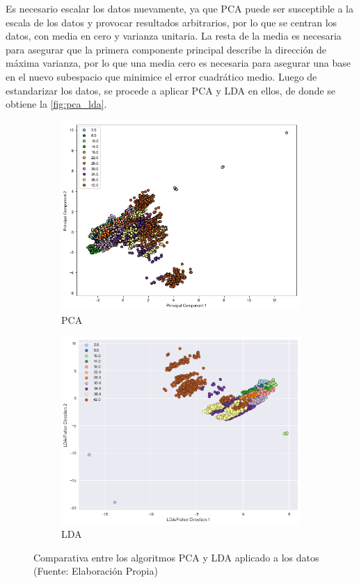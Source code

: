 Es necesario escalar los datos nuevamente, ya que PCA puede ser susceptible a la escala de los datos y provocar resultados arbitrarios, por lo que se centran los datos, con media en cero y varianza unitaria. La resta de la media es necesaria para asegurar que la primera componente principal describe la dirección de máxima varianza, por lo que una media cero es necesaria para asegurar una base en el nuevo subespacio que minimice el error cuadrático medio. Luego de estandarizar los datos, se procede a aplicar PCA y LDA en ellos, de donde se obtiene la \autoref{fig:pca_lda}.

\begin{figure}[ht!]
\centering
\begin{subfigure}{.5\textwidth}
  \centering
  \includegraphics[width=.8\linewidth]{figures/pca.png}
  \caption{PCA}
  \label{fig:sub1}
\end{subfigure}%
\begin{subfigure}{.5\textwidth}
  \centering
  \includegraphics[width=.8\linewidth]{figures/lda.png}
  \caption{LDA}
  \label{fig:sub2}
\end{subfigure}
\caption[Comparativa entre los algoritmos PCA y LDA]{Comparativa entre los algoritmos PCA y LDA aplicado a los datos \\
{\scriptsize (Fuente: Elaboración Propia)}}
\label{fig:pca_lda}
\end{figure}

